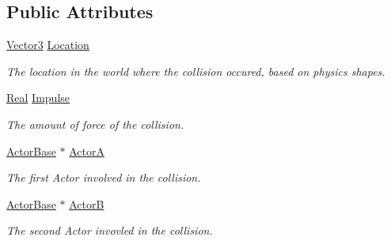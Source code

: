 \subsection*{Public Attributes}
\begin{DoxyCompactItemize}
\item 
\hypertarget{classphys_1_1EventCollision_a44aeae074fb10fa91ab1453f38144321}{
\hyperlink{classphys_1_1Vector3}{Vector3} \hyperlink{classphys_1_1EventCollision_a44aeae074fb10fa91ab1453f38144321}{Location}}
\label{dd/de9/classphys_1_1EventCollision_a44aeae074fb10fa91ab1453f38144321}

\begin{DoxyCompactList}\small\item\em The location in the world where the collision occured, based on physics shapes. \item\end{DoxyCompactList}\item 
\hypertarget{classphys_1_1EventCollision_a577552db818f54a4092baccf597823a2}{
\hyperlink{namespacephys_af7eb897198d265b8e868f45240230d5f}{Real} \hyperlink{classphys_1_1EventCollision_a577552db818f54a4092baccf597823a2}{Impulse}}
\label{dd/de9/classphys_1_1EventCollision_a577552db818f54a4092baccf597823a2}

\begin{DoxyCompactList}\small\item\em The amount of force of the collision. \item\end{DoxyCompactList}\item 
\hypertarget{classphys_1_1EventCollision_a2de905d0332c66293cbe990fe2dbbb07}{
\hyperlink{classphys_1_1ActorBase}{ActorBase} $\ast$ \hyperlink{classphys_1_1EventCollision_a2de905d0332c66293cbe990fe2dbbb07}{ActorA}}
\label{dd/de9/classphys_1_1EventCollision_a2de905d0332c66293cbe990fe2dbbb07}

\begin{DoxyCompactList}\small\item\em The first Actor involved in the collision. \item\end{DoxyCompactList}\item 
\hypertarget{classphys_1_1EventCollision_a922fd42b74db6df7a59cb5fd54cbadbe}{
\hyperlink{classphys_1_1ActorBase}{ActorBase} $\ast$ \hyperlink{classphys_1_1EventCollision_a922fd42b74db6df7a59cb5fd54cbadbe}{ActorB}}
\label{dd/de9/classphys_1_1EventCollision_a922fd42b74db6df7a59cb5fd54cbadbe}

\begin{DoxyCompactList}\small\item\em The second Actor invovled in the collision. \item\end{DoxyCompactList}\end{DoxyCompactItemize}


